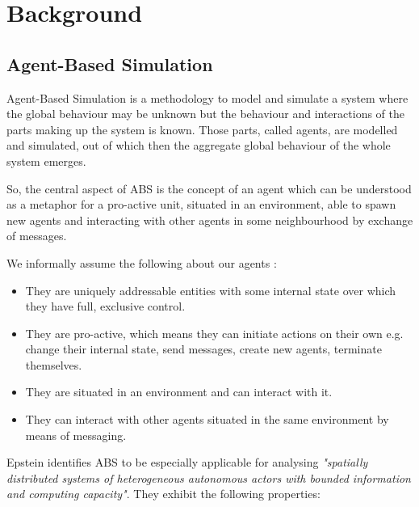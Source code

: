 \section{Background}
\label{sec:background}

\subsection{Agent-Based Simulation}
Agent-Based Simulation is a methodology to model and simulate a system where the global behaviour may be unknown but the behaviour and interactions of the parts making up the system is known. Those parts, called agents, are modelled and simulated, out of which then the aggregate global behaviour of the whole system emerges.

So, the central aspect of ABS is the concept of an agent which can be understood as a metaphor for a pro-active unit, situated in an environment, able to spawn new agents and interacting with other agents in some neighbourhood by exchange of messages. 

We informally assume the following about our agents \cite{siebers_introduction_2008, wooldridge_introduction_2009, macal_everything_2016}:

\begin{itemize}
	\item They are uniquely addressable entities with some internal state over which they have full, exclusive control.
	\item They are pro-active, which means they can initiate actions on their own e.g. change their internal state, send messages, create new agents, terminate themselves.
	\item They are situated in an environment and can interact with it.
	\item They can interact with other agents situated in the same environment by means of messaging.
\end{itemize} 

Epstein \cite{epstein_generative_2012} identifies ABS to be especially applicable for analysing \textit{"spatially distributed systems of heterogeneous autonomous actors with bounded information and computing capacity"}. They exhibit the following properties:

